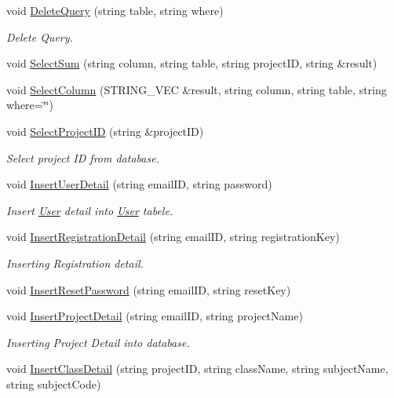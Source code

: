 \begin{DoxyCompactItemize}
void \hyperlink{classDatabase_a3ae42b73dea23470871c86af6b50bbf2}{Delete\-Query} (string table, string where)
\begin{DoxyCompactList}\small\item\em Delete Query. \end{DoxyCompactList}\item 
void \hyperlink{classDatabase_af237df2de117cf94e23d288ad3345ca0}{Select\-Sum} (string column, string table, string project\-I\-D, string \&result)
\item 
void \hyperlink{classDatabase_a52049c686ad213533bdb1c4f2ac3c157}{Select\-Column} (S\-T\-R\-I\-N\-G\-\_\-\-V\-E\-C \&result, string column, string table, string where=\char`\"{}\char`\"{})
\item 
void \hyperlink{classDatabase_a20f7ccadac8f3b67d4344f7da4594eda}{Select\-Project\-I\-D} (string \&project\-I\-D)
\begin{DoxyCompactList}\small\item\em Select project I\-D from database. \end{DoxyCompactList}\item 
void \hyperlink{classDatabase_ac2a20fd57ba7a51f819446e799d7100f}{Insert\-User\-Detail} (string email\-I\-D, string password)
\begin{DoxyCompactList}\small\item\em Insert \hyperlink{classUser}{User} detail into \hyperlink{classUser}{User} tabele. \end{DoxyCompactList}\item 
void \hyperlink{classDatabase_a0da52e0b3d6e36d0833da38a01e592ea}{Insert\-Registration\-Detail} (string email\-I\-D, string registration\-Key)
\begin{DoxyCompactList}\small\item\em Inserting Registration detail. \end{DoxyCompactList}\item 
void \hyperlink{classDatabase_a1ff67f74b3c9c7893880cfefda1dc692}{Insert\-Reset\-Password} (string email\-I\-D, string reset\-Key)
\item 
void \hyperlink{classDatabase_a12b1d8ae6998720ad1842382ef5aa6cc}{Insert\-Project\-Detail} (string email\-I\-D, string project\-Name)
\begin{DoxyCompactList}\small\item\em Inserting Project Detail into database. \end{DoxyCompactList}\item 
void \hyperlink{classDatabase_ad0052cd5a48f5ba3233395096ba6e422}{Insert\-Class\-Detail} (string project\-I\-D, string class\-Name, string subject\-Name, string subject\-Code)

\end{DoxyCompactItemize}

